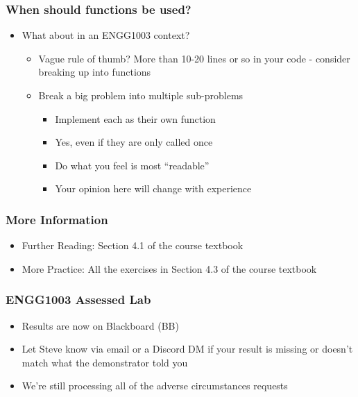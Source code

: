 \documentclass[english,14pt]{beamer}
\begin{document}
\begin{frame}
\frametitle{When should functions be used?}
\begin{itemize}
\item What about in an ENGG1003 context?
 
	\begin{itemize}
		\item Vague rule of thumb? More than 10-20 lines or so in your code - consider breaking up into functions
		\item Break a big problem into multiple sub-problems
			\begin{itemize}
				\item Implement each as their own function
				 
				\item Yes, even if they are only called once
				 
				\item Do what you feel is most ``readable''
				 
				\item Your opinion here will change with experience 
			\end{itemize}
	\end{itemize}
\end{itemize}
\end{frame}


\begin{frame}
\frametitle{More Information}
\begin{center}
	\begin{itemize}
		\item Further Reading: Section 4.1 of the course textbook
        \item More Practice: All the exercises in Section 4.3 of the course textbook  
    \end{itemize}
\end{center}
\end{frame}

\begin{frame}[fragile]
\frametitle{ENGG1003 Assessed Lab}
    \begin{itemize}
	    \item Results are now on Blackboard (BB)
	    \item Let Steve know via email or a Discord DM if your result is missing or doesn't match what the demonstrator told you
	    \item We're still processing all of the adverse circumstances requests
    \end{itemize}
\end{frame}
\end{document}
